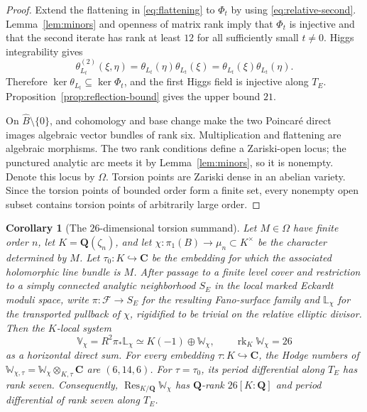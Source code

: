 \documentclass[11pt,reqno]{amsart}
\numberwithin{equation}{section}
\newtheorem{corollary}[theorem]{Corollary}
\theoremstyle{definition}
\theoremstyle{remark}
\newcommand{\C}{\mathbf C}
\newcommand{\Q}{\mathbf Q}
\newcommand{\rk}{\operatorname{rk}}
\begin{document}
\begin{proof}
Extend the flattening in \eqref{eq:flattening} to $\Phi_t$ by using
\eqref{eq:relative-second}.  Lemma~\ref{lem:minors} and openness of matrix rank imply that $\Phi_t$ is injective and that the second iterate has rank at least $12$ for all sufficiently small $t\ne0$.  Higgs integrability gives
\[
\theta_{L_t}^{(2)}(\xi,\eta)
=\theta_{L_t}(\eta)\theta_{L_t}(\xi)
=\theta_{L_t}(\xi)\theta_{L_t}(\eta).
\]
Therefore $\ker\theta_{L_t}\subseteq\ker\Phi_t$, and the first Higgs field is injective along $T_E$.  Proposition~\ref{prop:reflection-bound} gives the upper bound $21$.

On $\widehat B\setminus\{0\}$, \cite[Lemma~3.3]{KLM2026} and cohomology and base change make the two Poincar\'e direct images algebraic vector bundles of rank six.  Multiplication and flattening are algebraic morphisms.  The two rank conditions define a Zariski-open locus; the punctured analytic arc meets it by Lemma~\ref{lem:minors}, so it is nonempty.  Denote this locus by $\Omega$.  Torsion points are Zariski dense in an abelian variety.  Since the torsion points of bounded order form a finite set, every nonempty open subset contains torsion points of arbitrarily large order.
\end{proof}

\begin{corollary}[The $26$-dimensional torsion summand]\label{cor:26summand}
Let $M\in\Omega$ have finite order $n$, let $K=\Q(\zeta_n)$, and let
$\chi:\pi_1(B)\to\mu_n\subset K^\times$ be the character determined by $M$.  Let $\tau_0:K\hookrightarrow\C$ be the embedding for which the associated holomorphic line bundle is $M$.  After passage to a finite level cover and restriction to a simply connected analytic neighborhood $S_E$ in the local marked Eckardt moduli space, write $\pi:\mathscr F\to S_E$ for the resulting Fano-surface family and $\mathbb L_\chi$ for the transported pullback of $\chi$, rigidified to be trivial on the relative elliptic divisor.  Then the $K$-local system
\begin{equation}\label{eq:tate-splitting}
\mathbb V_\chi=R^2\pi_*\mathbb L_\chi
\simeq K(-1)\oplus\mathbb W_\chi,
\qquad \rk_K\mathbb W_\chi=26
\end{equation}
as a horizontal direct sum.  For every embedding $\tau:K\hookrightarrow\C$, the Hodge numbers of
$\mathbb W_{\chi,\tau}=\mathbb W_\chi\otimes_{K,\tau}\C$ are $(6,14,6)$.  For $\tau=\tau_0$, its period differential along $T_E$ has rank seven.  Consequently,
$\operatorname{Res}_{K/\Q}\mathbb W_\chi$ has $\Q$-rank $26[K:\Q]$ and period differential of rank seven along $T_E$.
\end{corollary}
\end{document}
